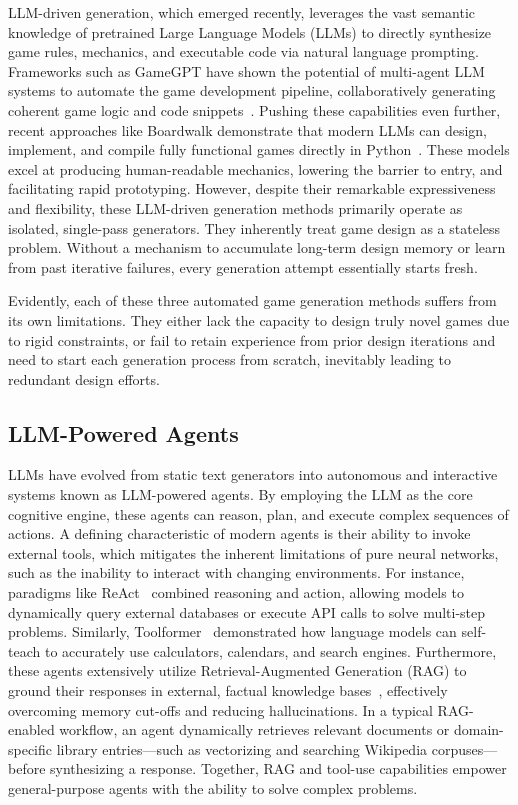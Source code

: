 \documentclass[conference]{IEEEtran}
\begin{document}
LLM-driven generation, which emerged recently, leverages the vast semantic knowledge of pretrained Large Language Models (LLMs) to directly synthesize game rules, mechanics, and executable code via natural language prompting. Frameworks such as GameGPT have shown the potential of multi-agent LLM systems to automate the game development pipeline, collaboratively generating coherent game logic and code snippets~\cite{chen2023gamegpt}. Pushing these capabilities even further, recent approaches like Boardwalk demonstrate that modern LLMs can design, implement, and compile fully functional games directly in Python~\cite{becker2025boardwalk}. These models excel at producing human-readable mechanics, lowering the barrier to entry, and facilitating rapid prototyping. However, despite their remarkable expressiveness and flexibility, these LLM-driven generation methods primarily operate as isolated, single-pass generators. They inherently treat game design as a stateless problem. Without a mechanism to accumulate long-term design memory or learn from past iterative failures, every generation attempt essentially starts fresh.

Evidently, each of these three automated game generation methods suffers from its own limitations. They either lack the capacity to design truly novel games due to rigid constraints, or fail to retain experience from prior design iterations and need to start each generation process from scratch, inevitably leading to redundant design efforts.

\subsection{LLM-Powered Agents}
LLMs have evolved from static text generators into autonomous and interactive systems known as LLM-powered agents. By employing the LLM as the core cognitive engine, these agents can reason, plan, and execute complex sequences of actions. A defining characteristic of modern agents is their ability to invoke external tools, which mitigates the inherent limitations of pure neural networks, such as the inability to interact with changing environments. For instance, paradigms like ReAct~\cite{yao2022react} combined reasoning and action, allowing models to dynamically query external databases or execute API calls to solve multi-step problems. Similarly, Toolformer~\cite{schick2023toolformer} demonstrated how language models can self-teach to accurately use calculators, calendars, and search engines. Furthermore, these agents extensively utilize Retrieval-Augmented Generation (RAG) to ground their responses in external, factual knowledge bases~\cite{lewis2020retrieval}, effectively overcoming memory cut-offs and reducing hallucinations. In a typical RAG-enabled workflow, an agent dynamically retrieves relevant documents or domain-specific library entries—such as vectorizing and searching Wikipedia corpuses—before synthesizing a response. Together, RAG and tool-use capabilities empower general-purpose agents with the ability to solve complex problems.
\end{document}
